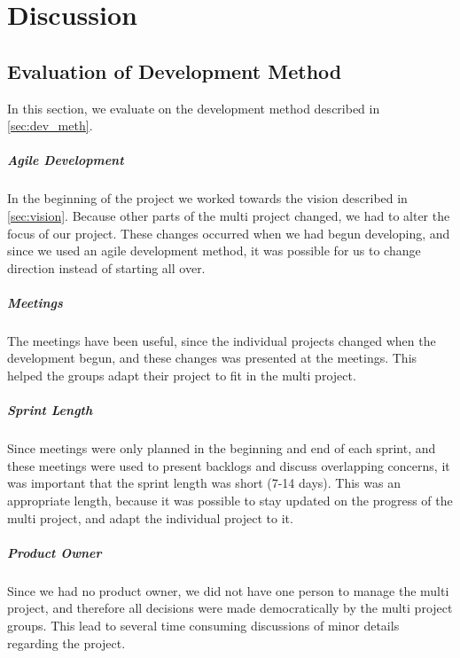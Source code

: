 \chapter{Discussion}

\section{Evaluation of Development Method}
In this section, we evaluate on the development method described in \autoref{sec:dev_meth}.\\

	\paragraph{Agile Development}
In the beginning of the project we worked towards the vision described in \autoref{sec:vision}. Because other parts of the multi project changed, we had to alter the focus of our project. These changes occurred when we had begun developing, and since we used an agile development method, it was possible for us to change direction instead of starting all over.

	\paragraph{Meetings}
The meetings have been useful, since the individual projects changed when the development begun, and these changes was presented at the meetings. This helped the groups adapt their project to fit in the multi project.

	\paragraph{Sprint Length}
Since meetings were only planned in the beginning and end of each sprint, and these meetings were used to present backlogs and discuss overlapping concerns, it was important that the sprint length was short (7-14 days). This was an appropriate length, because it was possible to stay updated on the progress of the multi project, and adapt the individual project to it.

	\paragraph{Product Owner}
Since we had no product owner, we did not have one person to manage the multi project, and therefore all decisions were made democratically by the multi project groups. This lead to several time consuming discussions of minor details regarding the project.

